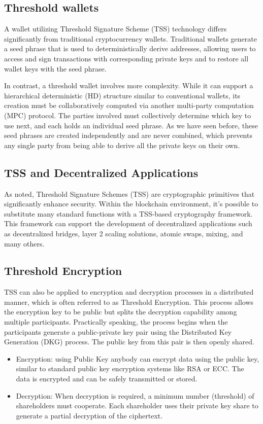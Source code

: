 \documentclass{article}
\begin{document}
\subsection{Threshold wallets}
A wallet utilizing Threshold Signature Scheme (TSS) technology differs significantly from traditional cryptocurrency wallets. Traditional wallets generate a seed phrase that is used to deterministically derive addresses, allowing users to access and sign transactions with corresponding private keys and to restore all wallet keys with the seed phrase.

In contrast, a threshold wallet involves more complexity. While it can support a hierarchical deterministic (HD) structure similar to conventional wallets, its creation must be collaboratively computed via another multi-party computation (MPC) protocol. The parties involved must collectively determine which key to use next, and each holds an individual seed phrase. As we have seen before, these seed phrases are created independently and are never combined, which prevents any single party from being able to derive all the private keys on their own.

\subsection{TSS and Decentralized Applications}
As noted, Threshold Signature Schemes (TSS) are cryptographic primitives that significantly enhance security. Within the blockchain environment, it's possible to substitute many standard functions with a TSS-based cryptography framework. This framework can support the development of decentralized applications such as decentralized bridges, layer 2 scaling solutions, atomic swaps, mixing, and many others.

\subsection{Threshold Encryption}
 TSS can also be applied to encryption and decryption processes in a distributed manner, which is often referred to as Threshold Encryption. This process allows the encryption key to be public but splits the decryption capability among multiple participants. 
Practically speaking, the process begins when the participants generate a public-private key pair using the Distributed Key Generation (DKG) process. The public key from this pair is then openly shared.
 \begin{itemize}
     \item Encryption: using Public Key anybody can encrypt data using the public key, similar to standard public key encryption systems like RSA or ECC. The data is encrypted and can be safely transmitted or stored.
     \item Decryption: When decryption is required, a minimum number (threshold) of shareholders must cooperate. Each shareholder uses their private key share to generate a partial decryption of the ciphertext.
 \end{itemize}
\end{document}

